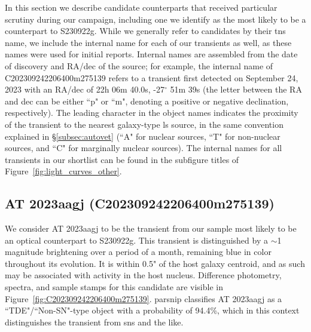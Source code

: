 \documentclass[twocolumn]{aastex631}
\newcommand{\gweventid}{S230922g\xspace}
\begin{document}
In this section we describe candidate counterparts that received particular scrutiny during our campaign, including one we identify as the most likely to be a counterpart to \gweventid.
While we generally refer to candidates by their \gls{tns} name, we include the internal name for each of our transients as well, as these names were used for initial reports.
Internal names are assembled from the date of discovery and RA/dec of the source; for example, the internal name of C202309242206400m275139 refers to a transient first detected on September 24, 2023 with an RA/dec of 22h 06m 40.0s, -27$^\circ$ 51m 39s (the letter between the RA and dec can be either ``p" or ``m", denoting a positive or negative declination, respectively).
The leading character in the object names indicates the proximity of the transient to the nearest galaxy-type \gls{ls} source, in the same convention explained in \S\ref{subsec:autovet} (``A" for nuclear sources, ``T" for non-nuclear sources, and ``C" for marginally nuclear sources).
The internal names for all transients in our shortlist can be found in the subfigure titles of Figure~\ref{fig:light_curves_other}.

\subsection{AT 2023aagj (C202309242206400m275139)}
\label{subsec:AT2023aagj}

We consider AT 2023aagj to be the transient from our sample most likely to be an optical counterpart to \gweventid.
This transient is distinguished by a $\sim$1 magnitude brightening over a period of a month, remaining blue in color throughout its evolution.
It is within 0.5" of the host galaxy centroid, and as such may be associated with activity in the host nucleus.
Difference photometry, spectra, and sample stamps for this candidate are visible in Figure~\ref{fig:C202309242206400m275139}.
\gls{parsnip} classifies AT 2023aagj as a ``TDE"/``Non-SN"-type object with a probability of 94.4\%, which in this context distinguishes the transient from \glspl{sn} and the like.
\end{document}
